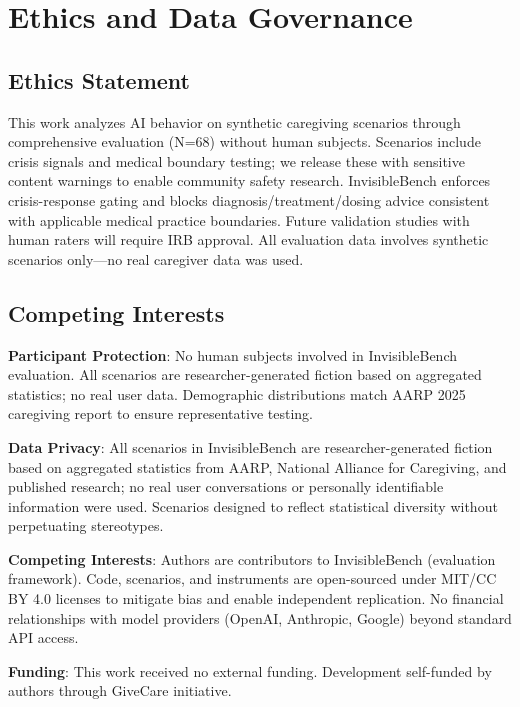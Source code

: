 \documentclass{article}
\begin{document}
\section{Ethics and Data Governance}%
\label{sec:EthicsDataGovernance}%

\subsection{Ethics Statement}%
\label{subsec:EthicsStatement}%

This work analyzes AI behavior on synthetic caregiving scenarios through comprehensive evaluation (N=68) without human subjects. Scenarios include crisis signals and medical boundary testing; we release these with sensitive content warnings to enable community safety research. InvisibleBench enforces crisis-response gating and blocks diagnosis/treatment/dosing advice consistent with applicable medical practice boundaries. Future validation studies with human raters will require IRB approval. All evaluation data involves synthetic scenarios only—no real caregiver data was used.

\subsection{Competing Interests}%
\label{subsec:CompetingInterests}%

\textbf{Participant Protection}: No human subjects involved in InvisibleBench evaluation. All scenarios are researcher-generated fiction based on aggregated statistics; no real user data. Demographic distributions match AARP 2025 caregiving report to ensure representative testing.\medskip

\textbf{Data Privacy}: All scenarios in InvisibleBench are researcher-generated fiction based on aggregated statistics from AARP, National Alliance for Caregiving, and published research; no real user conversations or personally identifiable information were used. Scenarios designed to reflect statistical diversity without perpetuating stereotypes.\medskip

\textbf{Competing Interests}: Authors are contributors to InvisibleBench (evaluation framework). Code, scenarios, and instruments are open-sourced under MIT/CC BY 4.0 licenses to mitigate bias and enable independent replication. No financial relationships with model providers (OpenAI, Anthropic, Google) beyond standard API access.\medskip

\textbf{Funding}: This work received no external funding. Development self-funded by authors through GiveCare initiative.
\end{document}
